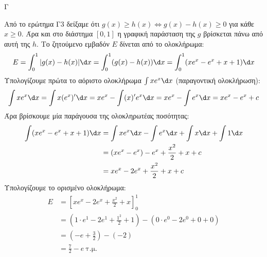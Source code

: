 \begin{thema}{Γ}
\begin{erwthma}
\item Από το ερώτημα Γ3 δείξαμε ότι $g(x) \ge h(x) \Leftrightarrow g(x) - h(x) \ge 0$ για κάθε $x \ge 0$. Άρα και στο διάστημα $[0,1]$ η γραφική παράσταση της $g$ βρίσκεται πάνω από αυτή της $h$.
Το ζητούμενο εμβαδόν $E$ δίνεται από το ολοκλήρωμα:
\[E = \int_0^1 |g(x) - h(x)| \d x = \int_0^1 (g(x) - h(x)) \d x = \int_0^1 (xe^x - e^x + x + 1) \d x\]
Υπολογίζουμε πρώτα το αόριστο ολοκλήρωμα $\int xe^x \d x$ (παραγοντική ολοκλήρωση):
\[\int xe^x \d x = \int x(e^x)' \d x = xe^x - \int (x)'e^x \d x = xe^x - \int e^x \d x = xe^x - e^x + c\]
Άρα βρίσκουμε μία παράγουσα της ολοκληρωτέας ποσότητας:
\begin{align*}
\int (xe^x - e^x + x + 1) \d x &= \int xe^x \d x - \int e^x \d x + \int x \d x + \int 1 \d x \\
&= (xe^x - e^x) - e^x + \frac{x^2}{2} + x + c \\
&= xe^x - 2e^x + \frac{x^2}{2} + x + c
\end{align*}
Υπολογίζουμε το ορισμένο ολοκλήρωμα:
\begin{align*}
E &= \left[ xe^x - 2e^x + \frac{x^2}{2} + x \right]_0^1 \\
&= \left( 1\cdot e^1 - 2e^1 + \frac{1^2}{2} + 1 \right) - \left( 0\cdot e^0 - 2e^0 + 0 + 0 \right) \\
&= \left( -e + \frac{3}{2} \right) - (-2) \\
&= \frac{7}{2} - e \ \text{τ.μ.}
\end{align*}
\end{erwthma}
\end{thema}

